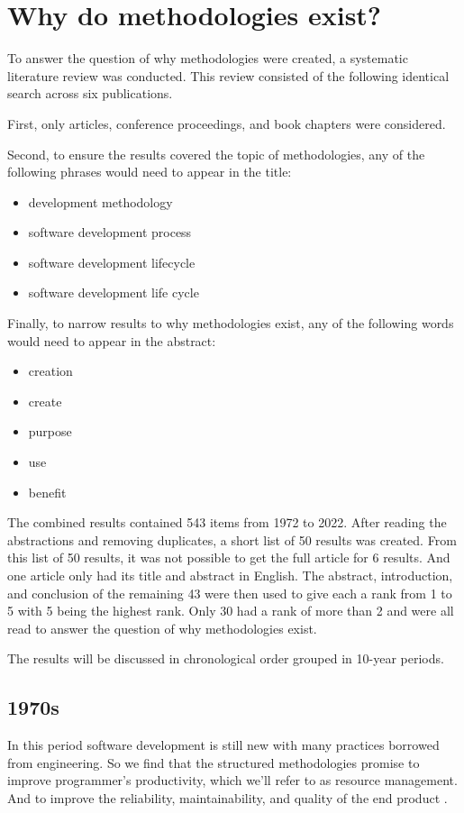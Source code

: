 \section{Why do methodologies exist?}
\label{sec:meth_why}
To answer the question of why methodologies were created, a systematic literature review was conducted.
This review consisted of the following identical search across six publications.

First, only articles, conference proceedings, and book chapters were considered.

Second, to ensure the results covered the topic of methodologies, any of the following phrases would need to appear in the title:
\begin{itemize}
    \item development methodology
    \item software development process
    \item software development lifecycle
    \item software development life cycle
\end{itemize}

Finally, to narrow results to why methodologies exist, any of the following words would need to appear in the abstract:
\begin{itemize}
    \item creation
    \item create
    \item purpose
    \item use
    \item benefit
\end{itemize}

The combined results contained 543 items from 1972 to 2022.
After reading the abstractions and removing duplicates, a short list of 50 results was created.
From this list of 50 results, it was not possible to get the full article for 6 results.
And one article only had its title and abstract in English.
The abstract, introduction, and conclusion of the remaining 43 were then used to give each a rank from 1 to 5 with 5 being the highest rank.
Only 30 had a rank of more than 2 and were all read to answer the question of why methodologies exist.

The results will be discussed in chronological order grouped in 10-year periods.

\subsection{1970s}
In this period software development is still new with many practices borrowed from engineering.
So we find that the structured methodologies promise to improve programmer's productivity, which we'll refer to as resource management.
And to improve the reliability, maintainability, and quality of the end product \cite{yourdon_1977}.

